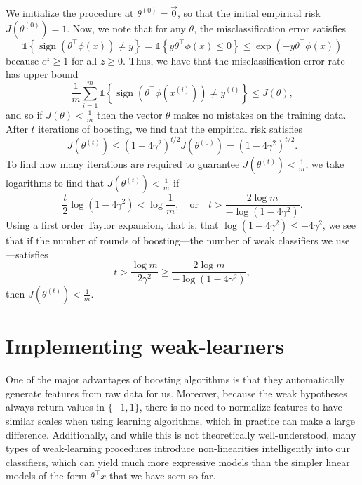 We initialize the procedure at $\theta^{(0)} = \vec{0}$, so that the initial empirical risk
$J(\theta^{(0)} ) = 1$. Now, we note that for any $\theta$, the misclassification error satisfies
\[
    \mathbb{1}\left\{\operatorname{sign}(\theta^\top \phi(x)) \ne y \right\}  = \mathbb{1}\left\{y\theta^\top\phi(x) \le 0 \right\} \le \exp\left(-y\theta^\top\phi(x) \right)
\]
because $e^z \ge 1$ for all $z \ge 0$. Thus, we have that the misclassification error
rate has upper bound
\[
    \frac{1}{m} \sum_{i=1}^m \mathbb{1}\left\{\operatorname{sign}(\theta^\top \phi(x^{(i)})) \ne y^{(i)}\right\} \le J(\theta),
\]
and so if $J(\theta) < \frac{1}{m}$ then the vector $\theta$ makes no mistakes on the training data.
After $t$ iterations of boosting, we find that the empirical risk satisfies
\[
J(\theta^{(t)} ) \le (1 - 4\gamma^2 )^{t/2} J(\theta^{(0)}) = (1 - 4\gamma^2)^{t/2}.
\]
To find how many iterations are required to guarantee $J(\theta^{(t)} ) < \frac{1}{m}$, we take
logarithms to find that $J(\theta^{(t)} ) < \frac{1}{m}$ if
\[
    \frac{t}{2}\log(1 - 4\gamma^2) < \log \frac{1}{m}, \quad\text{or}\quad t > \frac{2\log m}{-\log(1 - 4\gamma^2)}.
\]
Using a first order Taylor expansion, that is, that $\log(1 - 4\gamma^2 ) \le -4\gamma^2$, we
see that if the number of rounds of boosting---the number of weak classifiers
we use---satisfies
\[
    t > \frac{\log m}{2\gamma^2} \ge \frac{2\log m}{-\log(1 - 4\gamma^2)},
\]
then $J(\theta^{(t)} ) < \frac{1}{m}$.

\section{Implementing weak-learners}
One of the major advantages of boosting algorithms is that they automatically
generate features from raw data for us. Moreover, because the weak
hypotheses always return values in $\{-1,1\}$, there is no need to normalize
features to have similar scales when using learning algorithms, which in practice
can make a large difference. Additionally, and while this is not
theoretically well-understood, many types of weak-learning procedures introduce
non-linearities intelligently into our classifiers, which can yield much more
expressive models than the simpler linear models of the form $\theta^\top x$ that we
have seen so far.

